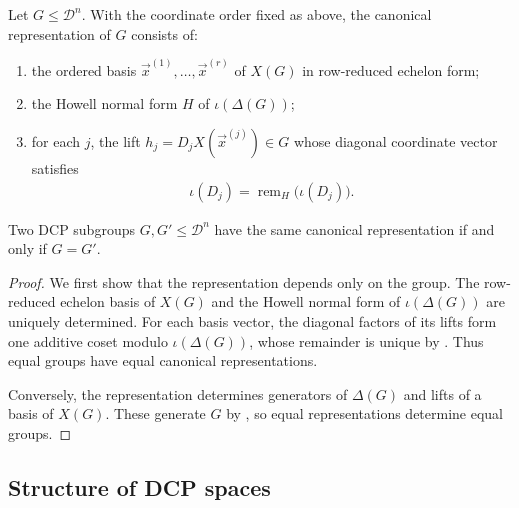 \begin{definition}
    \label{def:canon-form}
    Let $G\leq\mathcal{D}^n$.
    With the coordinate order fixed as above, the canonical representation of $G$ consists of:
    \begin{enumerate}
        \item the ordered basis $\vec{x}^{(1)},\ldots,\vec{x}^{(r)}$ of $X(G)$ in row-reduced echelon form;
        \item the Howell normal form $H$ of $\iota(\Delta(G))$;
        \item for each $j$, the lift $h_j=D_jX(\vec{x}^{(j)})\in G$ whose diagonal coordinate vector satisfies
        \begin{align}
            \iota(D_j)=\operatorname{rem}_H\big(\iota(D_j)\big).
        \end{align}
    \end{enumerate}
\end{definition}

\begin{proposition}
    Two DCP subgroups $G,G'\leq\mathcal{D}^n$ have the same canonical representation if and only if $G=G'$.
\end{proposition}

\begin{proof}
    We first show that the representation depends only on the group.
    The row-reduced echelon basis of $X(G)$ and the Howell normal form of $\iota(\Delta(G))$ are uniquely determined.
    For each basis vector, the diagonal factors of its lifts form one additive coset modulo $\iota(\Delta(G))$, whose remainder is unique by .
    Thus equal groups have equal canonical representations.

    Conversely, the representation determines generators of $\Delta(G)$ and lifts of a basis of $X(G)$.
    These generate $G$ by , so equal representations determine equal groups.
\end{proof}

\subsection{Structure of DCP spaces}

